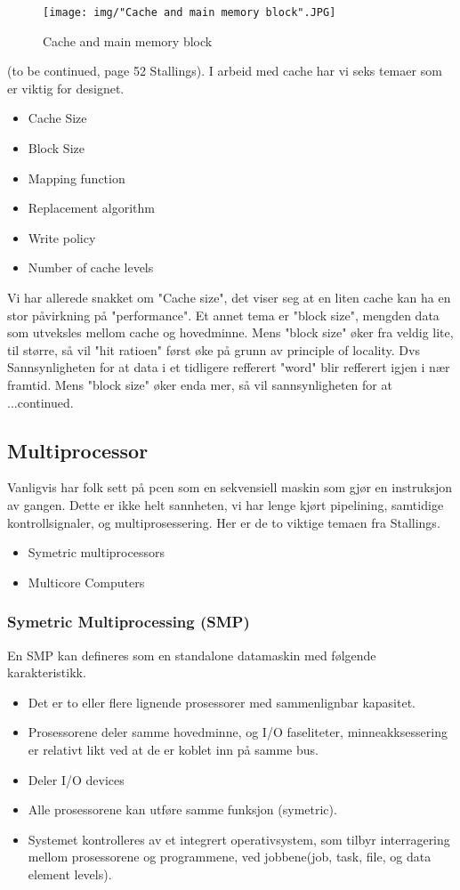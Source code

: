 \begin{figure}[h]
\centering
\texttt{[image: img/"Cache and main memory block".JPG]}
\caption{Cache and main memory block}
\label{fig:mem_block}
\end{figure}

(to be continued, page 52 Stallings).
I arbeid med cache har vi seks temaer som er viktig for designet.
\begin{itemize}
\item Cache Size
\item Block Size 
\item Mapping function 
\item Replacement algorithm 
\item Write policy
\item Number of cache levels 
\end{itemize}
Vi har allerede snakket om "Cache size", det viser seg at en liten cache kan ha en stor påvirkning på "performance". Et annet tema er "block size", mengden data som utveksles mellom cache og hovedminne. Mens "block size" øker fra veldig lite, til større, så vil "hit ratioen" først øke på grunn av principle of locality. Dvs Sannsynligheten for at data i et tidligere refferert "word" blir refferert igjen i nær framtid. Mens "block size" øker enda mer, så vil sannsynligheten for at ...continued.

\subsection{Multiprocessor}
Vanligvis har folk sett på pcen som en sekvensiell maskin som gjør en instruksjon av gangen. Dette er ikke helt sannheten, vi har lenge kjørt pipelining, samtidige kontrollsignaler, og multiprosessering.
Her er de to viktige temaen fra Stallings.
\begin{itemize}
\item Symetric multiprocessors
\item Multicore Computers
\end{itemize}
\subsubsection{Symetric Multiprocessing (SMP)}
En SMP kan defineres som en standalone datamaskin med følgende karakteristikk.
\begin{itemize}
\item Det er to eller flere lignende prosessorer med sammenlignbar kapasitet.
\item Prosessorene deler samme hovedminne, og I/O faseliteter, minneakksessering er relativt likt ved at de er koblet inn på samme bus.
\item Deler I/O devices
\item Alle prosessorene kan utføre samme funksjon (symetric).
\item Systemet kontrolleres av et integrert operativsystem, som tilbyr interragering mellom prosessorene og programmene, ved jobbene(job, task, file, og data element levels).
\end{itemize}

